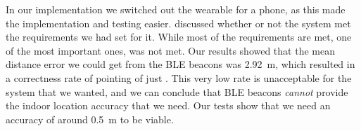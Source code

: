 In our implementation we switched out the wearable for a phone, 
as this made the implementation and testing easier. 
 discussed whether or not the system met the requirements we had set for it. 
While most of the requirements are met, 
one of the most important ones,
was not met. 
Our results showed that the mean distance error we could get from the BLE beacons was \SI{2.92}{\meter},
which resulted in a correctness rate of pointing of just . 
This very low rate is unacceptable for the system that we wanted, 
and we can conclude that BLE beacons \emph{cannot} provide the indoor location accuracy that we need. 
Our tests show that we need an accuracy of around \SI{0.5}{\meter} to be viable. 
